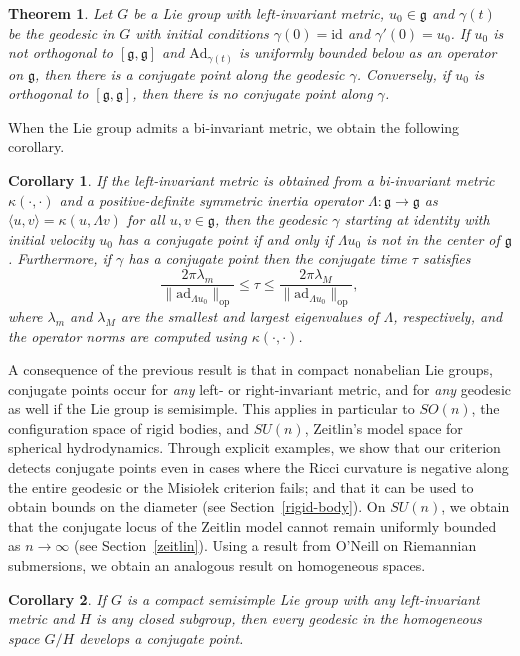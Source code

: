 \documentclass[oneside, 11pt]{amsart}
\newtheorem*{theorem*}{Theorem}
\newtheorem*{corollary*}{Corollary}
\numberwithin{equation}{section}
\newcommand{\ad}{\mathrm{ad}}
\newcommand{\Ad}{\mathrm{Ad}}
\newcommand{\id}{\mathrm{id}}
\newcommand{\g}{\mathfrak{g}}
\newcommand{\bim}{\kappa}
\begin{document}
\begin{theorem*}
Let $G$ be a Lie group with left-invariant metric, $u_0\in\g$ and $\gamma(t)$ be the geodesic in $G$ with initial conditions $\gamma(0)=\id$ and $\gamma'(0)=u_0$. If $u_0$ is not orthogonal to $[\mathfrak{g},\mathfrak{g}]$ and $\Ad_{\gamma(t)}$ is uniformly bounded below as an operator on $\mathfrak{g}$, then there is a conjugate point along the geodesic $\gamma$. Conversely,  if $u_0$ is orthogonal to $[\mathfrak{g},\mathfrak{g}]$, then there is no conjugate point along $\gamma$. 
\end{theorem*}
When the Lie group admits a bi-invariant metric, we obtain the following corollary.  
\begin{corollary*}
If the left-invariant metric is obtained from a bi-invariant metric $\bim(\cdot,\cdot)$ and a positive-definite symmetric inertia operator $\Lambda\colon\mathfrak{g}\to\mathfrak{g}$ as $\langle u,v\rangle = \bim(u,\Lambda v)$ for all $u,v\in\g$, then the geodesic $\gamma$ starting at identity with initial velocity $u_0$ has a conjugate point if and only if $\Lambda u_0$ is not in the center of $\mathfrak{g}$. Furthermore, if $\gamma$ has a conjugate point then the conjugate time $\tau$ satisfies
$$\frac{2\pi \lambda_m}{\lVert \ad_{\Lambda u_0}\rVert_{\text{op}}} \leq  \tau \leq \frac{2\pi \lambda_M}{\lVert \ad_{\Lambda u_0}\rVert_{\text{op}}},$$
where $\lambda_m$ and $\lambda_M$ are the smallest and largest eigenvalues of $\Lambda$, respectively, and the operator norms are computed using $\bim(\cdot, \cdot)$.
\end{corollary*}
A consequence of the previous result is that in compact nonabelian Lie groups, conjugate points occur for \emph{any} left- or right-invariant metric, and for \emph{any} geodesic as well if the Lie group is semisimple. This applies in particular to $SO(n)$, the configuration space of rigid bodies, and $SU(n)$, Zeitlin's model space for spherical hydrodynamics. Through explicit examples, we show that our criterion detects conjugate points even in cases where the Ricci curvature is negative along the entire geodesic or the Misio{\l}ek criterion fails; and that it can be used to obtain bounds on the diameter (see Section~\ref{rigid-body}). On $SU(n)$, we obtain that the conjugate locus of the Zeitlin model cannot remain uniformly bounded as $n\to\infty$ (see Section~\ref{zeitlin}). Using a result from O’Neill on Riemannian submersions, we obtain an analogous result on homogeneous spaces. 
\begin{corollary*}
If $G$ is a compact semisimple Lie group with any left-invariant metric and $H$ is any closed subgroup, then every geodesic in the homogeneous space $G/H$ develops a conjugate point.
\end{corollary*}
 
\end{document}
